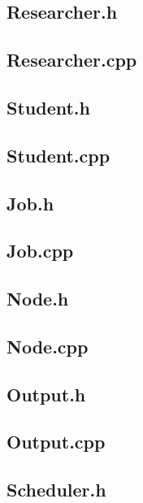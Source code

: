 \documentclass [10 pt, a4 paper]{report}
\begin{document}
\subsection{Researcher.h}

\subsection{Researcher.cpp}


\subsection{Student.h}

\subsection{Student.cpp}


\subsection{Job.h}

\subsection{Job.cpp}


\subsection{Node.h}

\subsection{Node.cpp}


\subsection{Output.h}

\subsection{Output.cpp}


\subsection{Scheduler.h}

\end{document}
